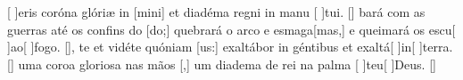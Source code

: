 {  %
  {[ ]{e}ris coróna glóriæ in [mini] et diadéma regni in manu [ ]{tu}i. [\LinkLA]}%
    {bará com as guerras até os confins do [do;] quebrará o arco e esmaga[mas,] e queimará os escu[ ]{ao}[ ]{fo}go. [\LinkPT]},
  {te et vidéte quóniam [us:] exaltábor in géntibus et exaltá[ ]{in}[ ]{ter}ra. [\LinkLA]}%
    { uma coroa gloriosa nas mãos [,] um diadema de rei na palma [ ]{teu}[ ]{Deus}. [\LinkPT]}
}